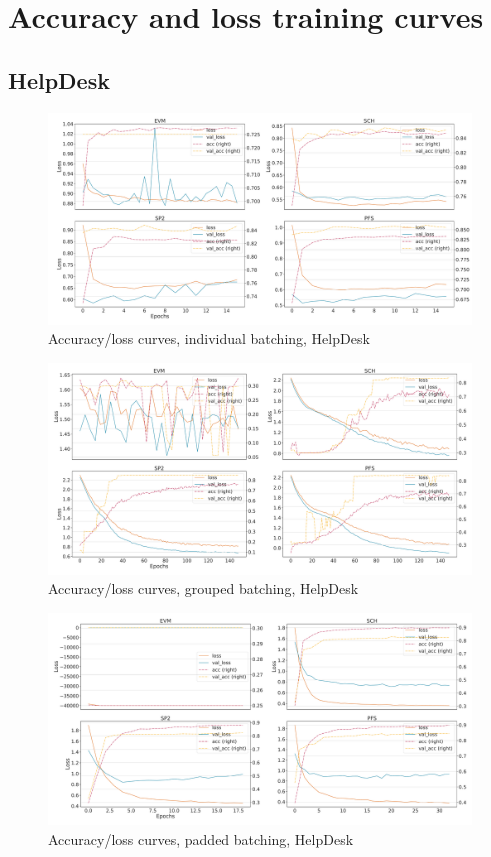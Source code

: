 \chapter{Accuracy and loss training curves}
\label{appendix:loss-curves}

\section*{HelpDesk}
\begin{figure}[!htb]
    \centering
    \includegraphics[width=\textwidth]{gfx/helpdesk/individual_loss_acc_curve.pdf}
    \caption{Accuracy/loss curves, individual batching, HelpDesk}
\end{figure}
\begin{figure}[!htb]
    \centering
    \includegraphics[width=\textwidth]{gfx/helpdesk/grouped_loss_acc_curve.pdf}
    \caption{Accuracy/loss curves, grouped batching, HelpDesk}
\end{figure}
\begin{figure}[!htb]
    \centering
    \includegraphics[width=\textwidth]{gfx/helpdesk/padded_loss_acc_curve.pdf}
    \caption{Accuracy/loss curves, padded batching, HelpDesk}
\end{figure}
